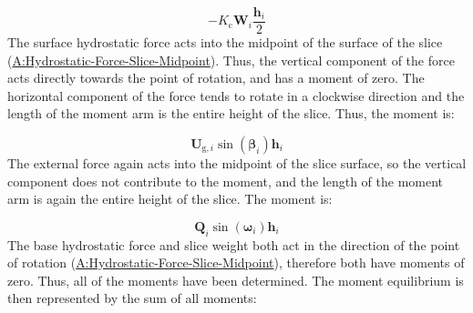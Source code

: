 \documentclass[12pt]{article}
\begin{document}
\begin{displaymath}
-{K_{\text{c}}} {\symbf{W}}_{i} \frac{{\symbf{h}}_{i}}{2}
\end{displaymath}
The surface hydrostatic force acts into the midpoint of the surface of the slice (\hyperref[assumpHFSM]{A:Hydrostatic-Force-Slice-Midpoint}). Thus, the vertical component of the force acts directly towards the point of rotation, and has a moment of zero. The horizontal component of the force tends to rotate in a clockwise direction and the length of the moment arm is the entire height of the slice. Thus, the moment is:

\begin{displaymath}
{\symbf{U}_{\text{g},i}} \sin\left({\symbf{β}}_{i}\right) {\symbf{h}}_{i}
\end{displaymath}
The external force again acts into the midpoint of the slice surface, so the vertical component does not contribute to the moment, and the length of the moment arm is again the entire height of the slice. The moment is:

\begin{displaymath}
{\symbf{Q}}_{i} \sin\left({\symbf{ω}}_{i}\right) {\symbf{h}}_{i}
\end{displaymath}
The base hydrostatic force and slice weight both act in the direction of the point of rotation (\hyperref[assumpHFSM]{A:Hydrostatic-Force-Slice-Midpoint}), therefore both have moments of zero. Thus, all of the moments have been determined. The moment equilibrium is then represented by the sum of all moments:
\end{document}
